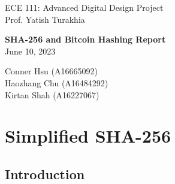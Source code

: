 \documentclass{article}
\begin{document}
\begin{titlepage}
   \begin{center}

       \large ECE 111: Advanced Digital Design Project \\
       Prof. Yatish Turakhia
       \vfill

       \LARGE\textbf{SHA-256 and Bitcoin Hashing Report} \\
   \vspace{0.8cm}
       \large June 10, 2023 \\

       \vfill

       Conner Hsu (A16665092) \\
       Haozhang Chu (A16484292) \\
       Kirtan Shah (A16227067)

       \date{\today}

   \end{center}
\end{titlepage}

\tableofcontents

\newpage
\section{Simplified SHA-256}

\subsection{Introduction}

\end{document}
